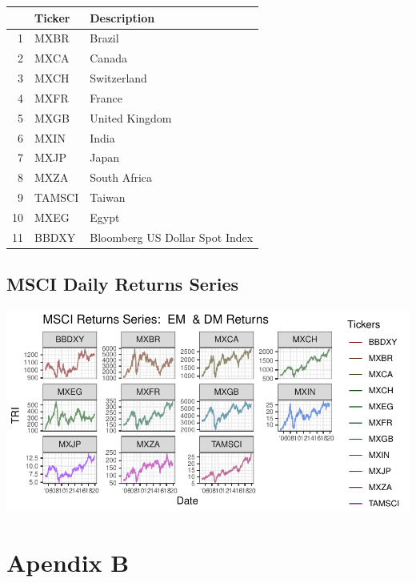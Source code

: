 \documentclass[11pt,preprint, authoryear]{elsarticle}
\let\origfigure\figure
\let\endorigfigure\endfigure
\renewenvironment{figure}[1][2] {
    \expandafter\origfigure\expandafter[H]
} {
    \endorigfigure
}
\let\origtable\table
\let\endorigtable\endtable
\renewenvironment{table}[1][2] {
    \expandafter\origtable\expandafter[H]
} {
    \endorigtable
}
\numberwithin{equation}{section}
\numberwithin{figure}{section}
\numberwithin{table}{section}
\begin{document}
\begin{table}[H]
\centering
\begin{tabular}{rll}
  \hline
 & Ticker & Description \\ 
  \hline
1 & MXBR & Brazil \\ 
  2 & MXCA & Canada \\ 
  3 & MXCH & Switzerland \\ 
  4 & MXFR & France \\ 
  5 & MXGB & United Kingdom \\ 
  6 & MXIN & India \\ 
  7 & MXJP & Japan \\ 
  8 & MXZA & South Africa \\ 
  9 & TAMSCI & Taiwan \\ 
  10 & MXEG & Egypt \\ 
  11 & BBDXY & Bloomberg US Dollar Spot Index \\ 
   \hline
\end{tabular}
\caption{Returns description Table \label{tab1}} 
\end{table}

\hypertarget{msci-daily-returns-series}{%
\subsection{MSCI Daily Returns Series}\label{msci-daily-returns-series}}

\begin{figure}[H]

{\centering \includegraphics{Impact-of-Dollar-Volatility-on-EM-DM-Equity-Markets_files/figure-latex/figure1-1} 

}

\caption{MSCI Returns \label{figure1}}\label{fig:figure1}
\end{figure}
\newpage

\hypertarget{apendix-b}{%
\section*{Apendix B}\label{apendix-b}}
\end{document}
